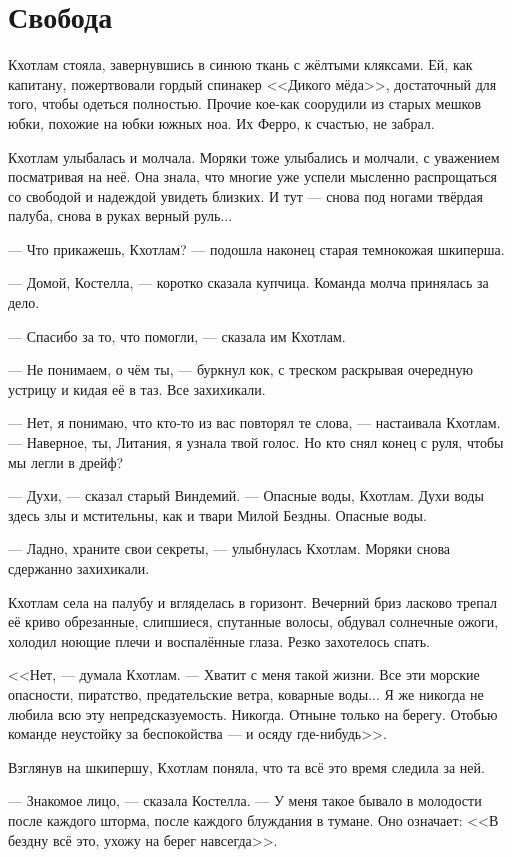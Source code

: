 \section{Свобода}

Кхотлам стояла, завернувшись в синюю ткань с жёлтыми кляксами.
Ей, как капитану, пожертвовали гордый спинакер <<Дикого мёда>>, достаточный для того, чтобы одеться полностью.
Прочие кое-как соорудили из старых мешков юбки, похожие на юбки южных ноа.
Их Ферро, к счастью, не забрал.

Кхотлам улыбалась и молчала.
Моряки тоже улыбались и молчали, с уважением посматривая на неё.
Она знала, что многие уже успели мысленно распрощаться со свободой и надеждой увидеть близких.
И тут --- снова под ногами твёрдая палуба, снова в руках верный руль...

--- Что прикажешь, Кхотлам? --- подошла наконец старая темнокожая шкиперша.

--- Домой, Костелла, --- коротко сказала купчица.
Команда молча принялась за дело.

--- Спасибо за то, что помогли, --- сказала им Кхотлам.

--- Не понимаем, о чём ты, --- буркнул кок, с треском раскрывая очередную устрицу и кидая её в таз.
Все захихикали.

--- Нет, я понимаю, что кто-то из вас повторял те слова, --- настаивала Кхотлам.
--- Наверное, ты, Литания, я узнала твой голос.
Но кто снял конец с руля, чтобы мы легли в дрейф?

--- Духи, --- сказал старый Виндемий.
--- Опасные воды, Кхотлам.
Духи воды здесь злы и мстительны, как и твари Милой Бездны.
Опасные воды.

--- Ладно, храните свои секреты, --- улыбнулась Кхотлам.
Моряки снова сдержанно захихикали.

Кхотлам села на палубу и вгляделась в горизонт.
Вечерний бриз ласково трепал её криво обрезанные, слипшиеся, спутанные волосы, обдувал солнечные ожоги, холодил ноющие плечи и воспалённые глаза.
Резко захотелось спать.

<<Нет, --- думала Кхотлам.
--- Хватит с меня такой жизни.
Все эти морские опасности, пиратство, предательские ветра, коварные воды...
Я же никогда не любила всю эту непредсказуемость.
Никогда.
Отныне только на берегу.
Отобью команде неустойку за беспокойства --- и осяду где-нибудь>>.

Взглянув на шкипершу, Кхотлам поняла, что та всё это время следила за ней.

--- Знакомое лицо, --- сказала Костелла.
--- У меня такое бывало в молодости после каждого шторма, после каждого блуждания в тумане.
Оно означает:
<<В бездну всё это, ухожу на берег навсегда>>.

